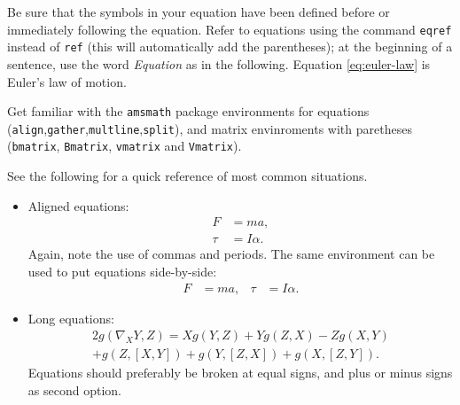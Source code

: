 \documentclass[letterpaper, 10 pt, conference]{ieeeconf}
\begin{document}
Be sure that the symbols in your equation have been defined before or immediately following the equation. Refer to equations using the command \texttt{eqref} instead of \texttt{ref} (this will automatically add the parentheses); at the beginning of a sentence, use the word \emph{Equation} as in the following. Equation \eqref{eq:euler-law} is Euler's law of motion.

Get familiar with the \verb|amsmath| package environments for equations (\verb|align|,\verb|gather|,\verb|multline|,\verb|split|), and matrix envinroments with paretheses (\verb|bmatrix|, \verb|Bmatrix|, \verb|vmatrix| and \verb|Vmatrix|).

See the following for a quick reference of most common situations.
\begin{itemize}
\item Aligned equations:
  \begin{align}
      F&=ma,\\
      \tau&=I\alpha.
  \end{align}
  Again, note the use of commas and periods. The same environment can be used to put equations side-by-side:
  \begin{align}
    F&=ma, & \tau&=I\alpha.
  \end{align}
\item Long equations:
  \begin{multline}
    2g(\nabla_XY,Z)=Xg(Y,Z)+Yg(Z,X)-Zg(X,Y)\\
    +g(Z,[X,Y])+g(Y,[Z,X])+g(X,[Z,Y]).
  \end{multline}
  Equations should preferably be broken at equal signs, and plus or minus signs as second option.


\end{itemize}
\end{document}

